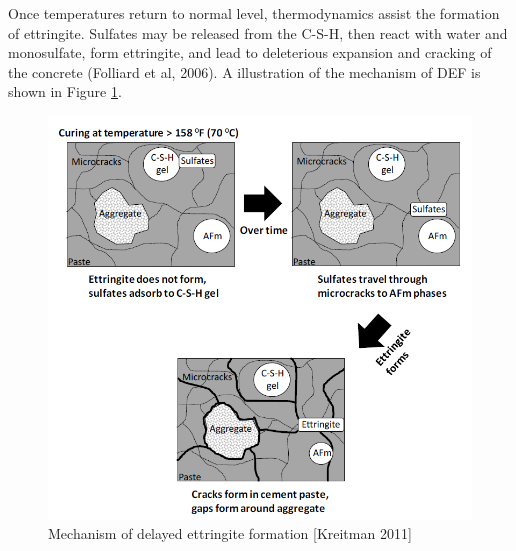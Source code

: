 
Once temperatures return to normal level, thermodynamics assist the formation of ettringite. Sulfates may be released from the C-S-H, then react with water and monosulfate, form ettringite, and lead to deleterious expansion and cracking of the concrete (Folliard et al, 2006\cite{Folliard}). A illustration of the mechanism of DEF is shown in Figure \ref{DEF_mechanism}.

 \begin{figure}[ht]
 \centering
 \includegraphics[width=.8\linewidth]{Reference/Kreitman2.png}
   \caption{Mechanism of delayed ettringite formation [Kreitman 2011]}
   \label{DEF_mechanism}
 \end{figure}

